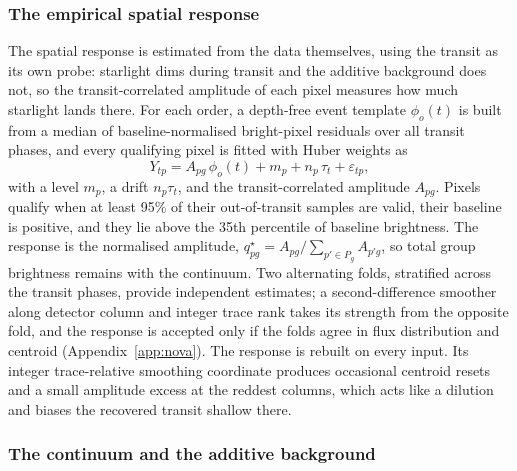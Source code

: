 \subsubsection{The empirical spatial response}


The spatial response is estimated from the data themselves, using the
transit as its own probe: starlight dims during transit and the additive
background does not, so the transit-correlated amplitude of each pixel
measures how much starlight lands there. For each order, a depth-free
event template $\phi_o(t)$ is built from a median of baseline-normalised
bright-pixel residuals over all transit phases, and every qualifying
pixel is fitted with Huber weights as
\begin{equation}
 Y_{tp} = A_{pg}\,\phi_{o}(t) + m_p + n_p\,\tau_t + \varepsilon_{tp},
 \label{eq:qstar-fit}
\end{equation}
with a level $m_p$, a drift $n_p\tau_t$, and the transit-correlated
amplitude $A_{pg}$. Pixels qualify when at least 95\% of their
out-of-transit samples are valid, their baseline is positive, and they
lie above the 35th percentile of baseline brightness. The response is the
normalised amplitude,
$q^\star_{pg}=A_{pg}/\sum_{p'\in P_g}A_{p'g}$, so total group brightness
remains with the continuum. Two alternating folds, stratified across the
transit phases, provide independent estimates; a second-difference
smoother along detector column and integer trace rank takes its strength
from the opposite fold, and the response is accepted only if the folds
agree in flux distribution and centroid (Appendix~\ref{app:nova}). The
response is rebuilt on every input. Its integer trace-relative smoothing
coordinate produces occasional centroid resets and a small amplitude
excess at the reddest columns, which acts like a dilution and biases the
recovered transit shallow there.

\subsubsection{The continuum and the additive background}


